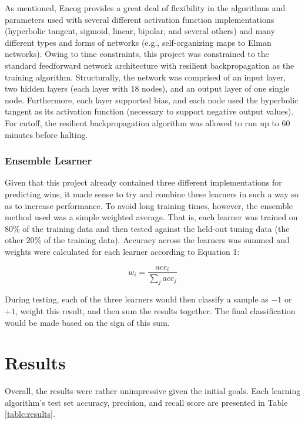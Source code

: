 \documentclass[10pt,letterpaper]{article}
\begin{document}
As mentioned, Encog provides a great deal of flexibility in the algorithms and parameters used with several different activation function implementations (hyperbolic tangent, sigmoid, linear, bipolar, and several others) and many different types and forms of networks (e.g., self-organizing maps to Elman networks).
Owing to time constraints, this project was constrained to the standard feedforward network architecture with resilient backpropagation as the training algorithm.
Structurally, the network was comprised of an input layer, two hidden layers (each layer with 18 nodes), and an output layer of one single node.
Furthermore, each layer supported bias, and each node used the hyperbolic tangent as its activation function (necessary to support negative output values).
For cutoff, the resilient backpropagation algorithm was allowed to run up to 60 minutes before halting.

\subsubsection{Ensemble Learner}

Given that this project already contained three different implementations for predicting wins, it made sense to try and combine these learners in such a way so as to increase performance.
To avoid long training times, however, the ensemble method used was a simple weighted average.
That is, each learner was trained on 80\% of the training data and then tested against the held-out tuning data (the other 20\% of the training data).
Accuracy across the learners was summed and weights were calculated for each learner according to Equation 1:

\begin{equation}
w_i = \frac{acc_i}{\sum_j acc_j}
\end{equation}

During testing, each of the three learners would then classify a sample as $-1$ or $+1$, weight this result, and then sum the results together.
The final classification would be made based on the sign of this sum.

\section{Results}

Overall, the results were rather unimpressive given the initial goals.
Each learning algorithm's test set accuracy, precision, and recall score are presented in Table \ref{table:results}.
\end{document}
